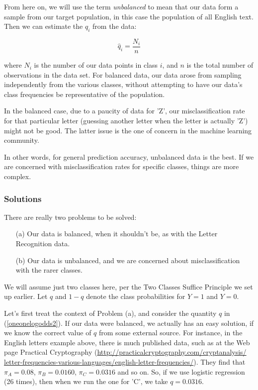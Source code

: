 From here on, we will use the term {\it unbalanced} to mean that our
data form a sample from our target population, in this case the
population of all English text. Then we can estimate the $q_i$ from the
data:

\begin{equation}
\label{qihat}
\widehat{q}_i = \frac{N_i}{n}
\end{equation}

where $N_i$ is the number of our data points in class $i$, and $n$ is
the total number of observations in the data set.  For balanced data,
our data arose from sampling independently from the various classes,
without attempting to have our data's class frequencies be
representative of the population.

In the balanced case, due to a paucity of data for 'Z', our
misclassification rate for that particular letter (guessing another
letter when the letter is actually 'Z') might not be good.  The latter
issue is the one of concern in the machine learning community.

In other words, for general prediction accuracy, unbalanced data is the
best.  If we are concerned with misclassification rates for specific
classes, things are more complex.

\subsubsection{Solutions}

There are really two problems to be solved:

\begin{itemize}

\item [(a)] Our data is balanced, when it shouldn't be, as with the Letter
Recognition data.

\item [(b)] Our data is unbalanced, and we are concerned about
misclassification with the rarer classes.

\end{itemize}

We will assume just two classes here, per the Two Classes Suffice
Principle we set up earlier.  Let $q$ and $1-q$ denote the class
probabilities for $Y = 1$ and $Y = 0$.

Let's first treat the context of Problem (a), and consider the quantity
$q$ in (\ref{oneonelogodds2}). If our data were balanced, we actually
has an easy solution, if we know the correct value of $q$ from some
external source. For instance, in the English letters example above,
there is much published data, such as at the Web page Practical
Cryptography (\url{http://practicalcryptography.com/cryptanalysis/
letter-frequencies-various-languages/english-letter-frequencies/}). They
find that $\pi_A = 0.08$, $\pi_B = 0.0160$, $\pi_C = 0.0316$ and so on.
So, if we use logistic regression (26 times), then when we run the one
for 'C', we take $q = 0.0316$.

